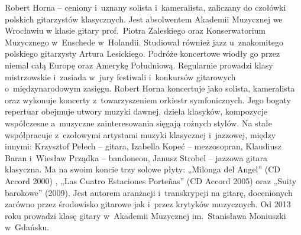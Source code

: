 \documentclass[twoside,a4page]{article}
\begin{document}
\fontsize{10pt}{14pt}\selectfont
Robert Horna – ceniony i~uznany solista i~kameralista, zaliczany do
czołówki polskich gitarzystów klasycznych. Jest absolwentem Akademii
Muzycznej we Wrocławiu w klasie gitary prof.~Piotra Zaleskiego oraz
Konserwatorium Muzycznego w~Enschede w~Holandii. Studiował również
jazz u~znakomitego polskiego gitarzysty Artura Lesickiego. Podróże
koncertowe wiodły go przez niemal całą Europę oraz Amerykę
Południową. Regularnie prowadzi klasy mistrzowskie i~zasiada w~jury
festiwali i~konkursów gitarowych o~międzynarodowym zasięgu. Robert
Horna koncertuje jako solista, kameralista oraz wykonuje koncerty
z~towarzyszeniem orkiestr symfonicznych. Jego bogaty repertuar obejmuje
utwory muzyki dawnej, dzieła klasyków, kompozycje współczesne
a~muzyczne zainteresowania sięgają rożnych stylów. Na stałe współpracuje
z~czołowymi artystami muzyki klasycznej i~jazzowej, między innymi:
Krzysztof Pełech – gitara, Izabella Kopeć – mezzosopran, Klaudiusz
Baran i~Wiesław Prządka – bandoneon, Janusz Strobel – jazzowa gitara
klasyczna. Ma na swoim koncie trzy solowe płyty: „Milonga del Angel”
(CD Accord 2000) , „Las Cuatro Estaciones Porteñas” (CD Accord 2005)
oraz „Suity barokowe” (2009). Jest autorem aranżacji i~transkrypcji na
gitarę, docenionych zarówno przez środowisko gitarowe jak i~przez
krytyków muzycznych. Od 2013 roku prowadzi klasę gitary w~Akademii
Muzycznej im.~Stanisława Moniuszki w~Gdańsku.
\end{document}
